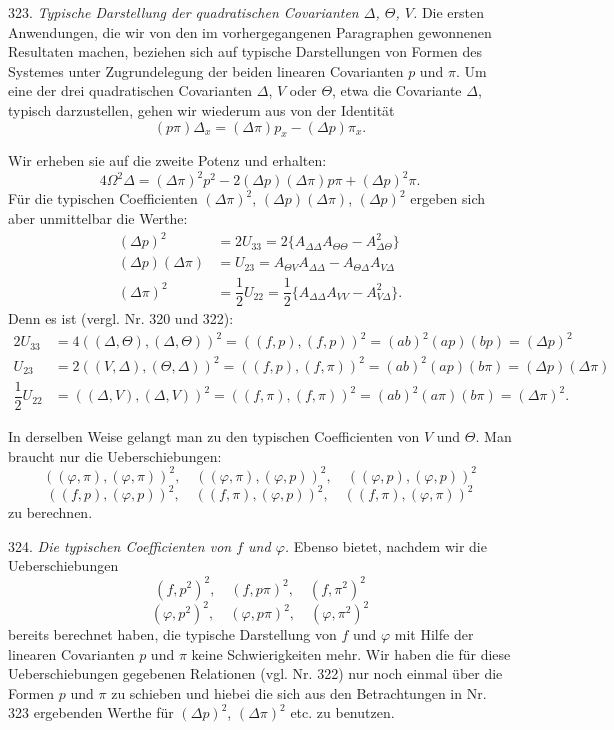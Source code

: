 \documentclass[11pt]{article}
\providecommand{\weberpage}[1]{}
\let\Delta\varDelta
\let\Theta\varTheta
\let\Omega\varOmega
\begin{document}
323. \textit{Typische Darstellung der quadratischen Covarianten
$\Delta$, $\Theta$, $V$.} Die ersten Anwendungen, die wir von den im
vorhergegangenen Paragraphen gewonnenen Resultaten machen, beziehen
sich auf typische Darstellungen von Formen des Systemes unter
Zugrundelegung der beiden linearen Covarianten $p$ und $\pi$. Um eine
der drei quadratischen Covarianten $\Delta$, $V$ oder $\Theta$, etwa
die Covariante $\Delta$, typisch darzustellen, gehen wir wiederum aus
von der Identität
\[
(p\pi)\Delta_x=(\Delta\pi)p_x-(\Delta p)\pi_x.
\]


\weberpage{347}

Wir erheben sie auf die zweite Potenz und erhalten:
\[
4\Omega^2\Delta=(\Delta\pi)^2p^2-2(\Delta p)(\Delta\pi)p\pi+(\Delta p)^2\pi.
\]
Für die typischen Coefficienten $(\Delta\pi)^2$, $(\Delta p)(\Delta\pi)$,
$(\Delta p)^2$ ergeben sich aber unmittelbar die Werthe:
\[
\begin{aligned}
(\Delta p)^2&=2U_{33}=2\{A_{\Delta\Delta}A_{\Theta\Theta}-A_{\Delta\Theta}^2\}\\
(\Delta p)(\Delta\pi)&=U_{23}=A_{\Theta V}A_{\Delta\Delta}-A_{\Theta\Delta}A_{V\Delta}\\
(\Delta\pi)^2&=\dfrac{1}{2}U_{22}=\dfrac{1}{2}\{A_{\Delta\Delta}A_{VV}-A_{V\Delta}^2\}.
\end{aligned}
\]
Denn es ist (vergl. Nr. 320 und 322):
\[
\begin{aligned}
2U_{33}&=4((\Delta,\Theta),(\Delta,\Theta))^2=((f,p),(f,p))^2=(ab)^2(ap)(bp)=(\Delta p)^2\\
U_{23}&=2((V,\Delta),(\Theta,\Delta))^2=((f,p),(f,\pi))^2=(ab)^2(ap)(b\pi)=(\Delta p)(\Delta\pi)\\
\dfrac{1}{2}U_{22}&=((\Delta,V),(\Delta,V))^2=((f,\pi),(f,\pi))^2=(ab)^2(a\pi)(b\pi)=(\Delta\pi)^2.
\end{aligned}
\]

In derselben Weise gelangt man zu den typischen Coefficienten von $V$
und $\Theta$. Man braucht nur die Ueberschiebungen:
\[
((\varphi,\pi),(\varphi,\pi))^2,\quad ((\varphi,\pi),(\varphi,p))^2,\quad ((\varphi,p),(\varphi,p))^2
\]
\[
((f,p),(\varphi,p))^2,\quad ((f,\pi),(\varphi,p))^2,\quad ((f,\pi),(\varphi,\pi))^2
\]
zu berechnen.

324. \textit{Die typischen Coefficienten von $f$ und $\varphi$.} Ebenso
bietet, nachdem wir die Ueberschiebungen
\[
(f,p^2)^2,\quad (f,p\pi)^2,\quad (f,\pi^2)^2
\]
\[
(\varphi,p^2)^2,\quad (\varphi,p\pi)^2,\quad (\varphi,\pi^2)^2
\]
bereits berechnet haben, die typische Darstellung von $f$ und $\varphi$
mit Hilfe der linearen Covarianten $p$ und $\pi$ keine Schwierigkeiten
mehr. Wir haben die für diese Ueberschiebungen gegebenen Relationen
(vgl. Nr. 322) nur noch einmal über die Formen $p$ und $\pi$ zu
schieben und hiebei die sich aus den Betrachtungen in Nr. 323
ergebenden Werthe für $(\Delta p)^2$, $(\Delta\pi)^2$ etc. zu benutzen.
\end{document}
